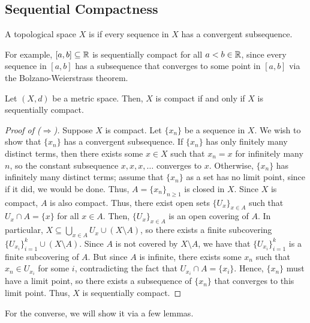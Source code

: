 \subsection{Sequential Compactness}
\begin{definition}
    A topological space $X$ is  if every sequence in $X$ has a convergent subsequence.
\end{definition}

For example, $[a,b] \subseteq \mathbb{R}$ is sequentially compact for all $a < b \in \mathbb{R}$, since every sequence in $[a,b]$ has a subsequence that converges to some point in $[a,b]$ via the Bolzano-Weierstrass theorem. 

\begin{theorem}
    Let $(X,d)$ be a metric space. Then, $X$ is compact if and only if $X$ is sequentially compact.
\end{theorem}

\begin{proof}[Proof of ($\Rightarrow$)]
    Suppose $X$ is compact. Let $\{x_{n}\}$ be a sequence in $X$. We wish to show that $\{x_{n}\}$ has a convergent subsequence. If $\{x_{n}\}$ has only finitely many distinct terms, then there exists some $x \in X$ such that $x_{n} = x$ for infinitely many $n$, so the constant subsequence $x,x,x,\ldots$ converges to $x$. Otherwise, $\{x_{n}\}$ has infinitely many distinct terms; assume that $\{x_{n}\}$ as a set has no limit point, since if it did, we would be done. Thus, $A = \{x_{n}\}_{n \geq 1}$ is closed in $X$. Since $X$ is compact, $A$ is also compact. Thus, there exist open sets $\{U_{x}\}_{x \in A}$ such that $U_{x} \cap A = \{x\}$ for all $x \in A$. Then, $\{U_{x}\}_{x \in A}$ is an open covering of $A$. In particular, $X \subseteq \bigcup_{x \in A} U_{x} \cup (X \setminus A)$, so there exists a finite subcovering $\{U_{x_{i}}\}_{i=1}^{k} \cup (X \setminus A)$. Since $A$ is not covered by $X \setminus A$, we have that $\{U_{x_{i}}\}_{i=1}^{k}$ is a finite subcovering of $A$. But since $A$ is infinite, there exists some $x_{n}$ such that $x_{n} \in U_{x_{i}}$ for some $i$, contradicting the fact that $U_{x_{i}} \cap A = \{x_{i}\}$. Hence, $\{x_{n}\}$ must have a limit point, so there exists a subsequence of $\{x_{n}\}$ that converges to this limit point. Thus, $X$ is sequentially compact. 
\end{proof}

For the converse, we will show it via a few lemmas.

